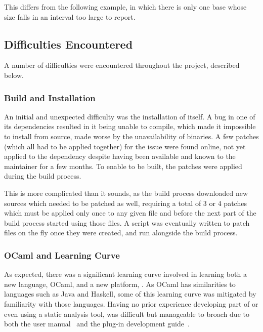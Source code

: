 This differs from the following example, in which there is only one base whose size falls in an interval too large to report.



\subsection{Difficulties Encountered}

A number of difficulties were encountered throughout the project, described below.

\subsubsection{Build and Installation}

An initial and unexpected difficulty was the installation of  itself. A bug in one of its dependencies resulted in it being unable to compile, which made it impossible to install from source, made worse by the unavailability of binaries. A few patches (which all had to be applied together) for the issue were found online, not yet applied to the dependency despite having been available and known to the maintainer for a few months. To enable  to be built, the patches were applied during the build process.

This is more complicated than it sounds, as the build process downloaded new sources which needed to be patched as well, requiring a total of 3 or 4 patches which must be applied only once to any given file and before the next part of the build process started using those files. A script was eventually written to patch files on the fly once they were created, and run alongside the build process.

\subsubsection{OCaml and  Learning Curve}

As expected, there was a significant learning curve involved in learning both a new language, OCaml, and a new platform, . As OCaml has similarities to languages such as Java and Haskell, some of this learning curve was mitigated by familiarity with those languages. Having no prior experience developing part of or even using a static analysis tool,  was difficult but manageable to broach due to both the user manual~\cite{framauser} and the plug-in development guide~\cite{framaplug}.

